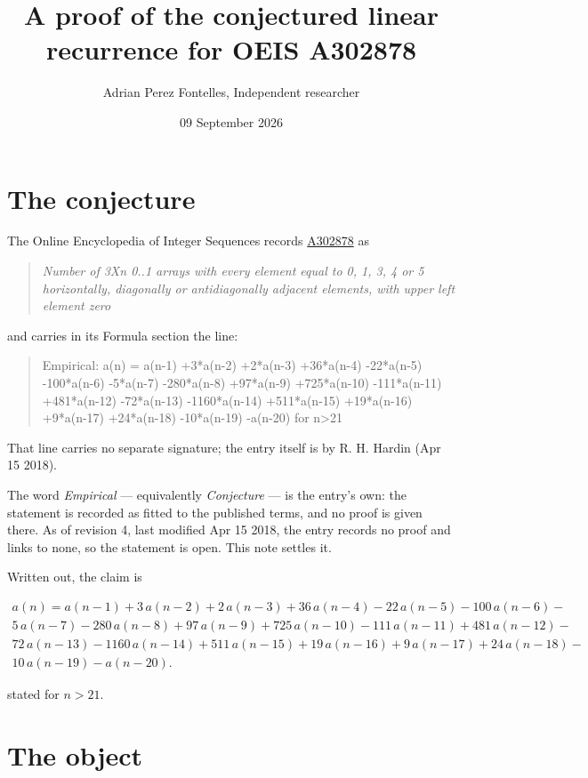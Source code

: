 \documentclass[11pt]{article}
\title{A proof of the conjectured linear recurrence for OEIS A302878}
\author{Adrian Perez Fontelles, Independent researcher}
\date{09 September 2026}
\theoremstyle{definition}
\begin{document}
\maketitle
\section{The conjecture}

The Online Encyclopedia of Integer Sequences records \href{https://oeis.org/A302878}{A302878} as

\begin{quote}\itshape Number of 3Xn 0..1 arrays with every element equal to 0, 1, 3, 4 or 5 horizontally, diagonally or antidiagonally adjacent elements, with upper left element zero\end{quote}

and carries in its Formula section the line:

\begin{quote}\ttfamily Empirical: a(n) = a(n-1) +3*a(n-2) +2*a(n-3) +36*a(n-4) -22*a(n-5) -100*a(n-6) -5*a(n-7) -280*a(n-8) +97*a(n-9) +725*a(n-10) -111*a(n-11) +481*a(n-12) -72*a(n-13) -1160*a(n-14) +511*a(n-15) +19*a(n-16) +9*a(n-17) +24*a(n-18) -10*a(n-19) -a(n-20) for n>21\end{quote}

That line carries no separate signature; the entry itself is by R. H. Hardin (Apr 15 2018).

The word {\itshape Empirical} --- equivalently {\itshape Conjecture} --- is the entry's own: the statement is recorded as fitted to the published terms, and no proof is given there. As of revision 4, last modified Apr 15 2018, the entry records no proof and links to none, so the statement is open. This note settles it.

Written out, the claim is

\begin{multline*} a(n) = a(n-1) + 3\,a(n-2) + 2\,a(n-3) + 36\,a(n-4) - 22\,a(n-5) - 100\,a(n-6) - \\ 5\,a(n-7) - 280\,a(n-8) + 97\,a(n-9) + 725\,a(n-10) - 111\,a(n-11) + 481\,a(n-12) - \\ 72\,a(n-13) - 1160\,a(n-14) + 511\,a(n-15) + 19\,a(n-16) + 9\,a(n-17) + 24\,a(n-18) - \\ 10\,a(n-19) - a(n-20). \end{multline*}

stated for $n > 21$.

\section{The object}
\end{document}

